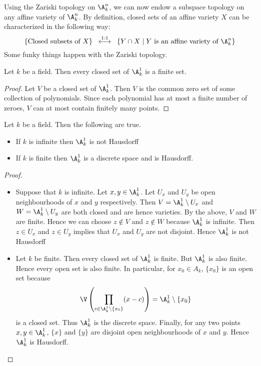 \documentclass[a4paper]{article}
\begin{document}
Using the Zariski topology on $\A_k^n$, we can now endow a subspace topology on any affine variety of $\A_k^n$. By definition, closed sets of an affine variety $X$ can be characterized in the following way: $$\left\{\text{Closed subsets of }X\right\}\;\;\overset{1:1}{\longleftrightarrow}\;\;\left\{Y\cap X\;|\; Y\text{ is an affine variety of }\A_k^n\right\}$$ Some funky things happen with the Zariski topology. 

\begin{lmm}{}{} Let $k$ be a field. Then every closed set of $\A_k^1$ is a finite set. 
\begin{proof}
Let $V$ be a closed set of $\A_k^1$. Then $V$ is the common zero set of some collection of polynomials. Since each polynomial has at most a finite number of zeroes, $V$ can at most contain finitely many points. 
\end{proof}
\end{lmm}

\begin{eg}{}{} Let $k$ be a field. Then the following are true. 
\begin{itemize}
\item If $k$ is infinite then $\A_k^1$ is not Hausdorff
\item If $k$ is finite then $\A_k^1$ is a discrete space and is Hausdorff. 
\end{itemize} 
\begin{proof}~\\
\begin{itemize}
\item Suppose that $k$ is infinite. Let $x,y\in\A_k^1$. Let $U_x$ and $U_y$ be open neighbourhoods of $x$ and $y$ respectively. Then $V=\A_k^1\setminus U_x$ and $W=\A_k^1\setminus U_y$ are both closed and are hence varieties. By the above, $V$ and $W$ are finite. Hence we can choose $z\notin V$ and $z\notin W$ because $\A_k^1$ is infinite. Then $z\in U_x$ and $z\in U_y$ implies that $U_x$ and $U_y$ are not disjoint. Hence $\A_k^1$ is not Hausdorff
\item Let $k$ be finite. Then every closed set of $\A_k^1$ is finite. But $\A_k^1$ is also finite. Hence every open set is also finite. In particular, for $x_0\in A_k$, $\{x_0\}$ is an open set because $$\V\left(\prod_{c\in\A_k^1\setminus\{x_0\}}(x-c)\right)=\A_k^1\setminus\{x_0\}$$ is a closed set. Thus $\A_k^1$ is the discrete space. Finally, for any two points $x,y\in\A_k^1$, $\{x\}$ and $\{y\}$ are disjoint open neighbourhoods of $x$ and $y$. Hence $\A_k^1$ is Hausdorff. 
\end{itemize}
\end{proof}
\end{eg}
\end{document}
